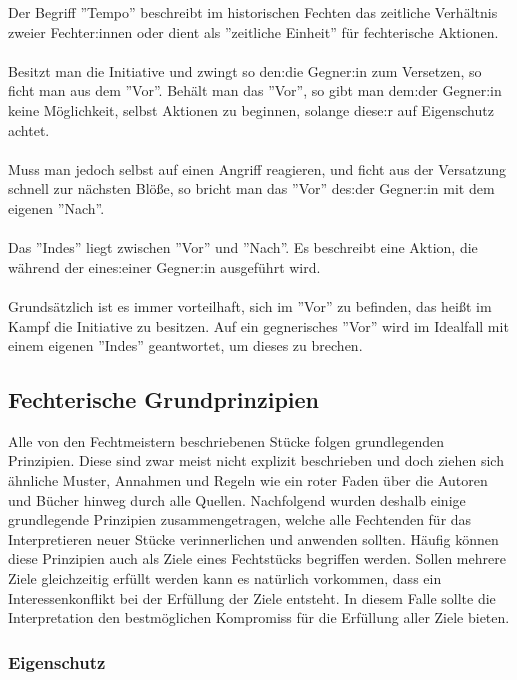 Der Begriff ''Tempo'' beschreibt im historischen Fechten das zeitliche Verhältnis zweier Fechter:innen oder dient als ''zeitliche Einheit'' für fechterische Aktionen.
\\
\\
Besitzt man die Initiative und zwingt so den:die Gegner:in zum Versetzen, so ficht man aus dem ''Vor''.
Behält man das ''Vor'', so gibt man dem:der Gegner:in keine Möglichkeit, selbst Aktionen zu beginnen, solange diese:r auf Eigenschutz achtet.
\\
\\
Muss man jedoch selbst auf einen Angriff reagieren, und ficht aus der Versatzung schnell zur nächsten Blöße, so bricht man das ''Vor'' des:der Gegner:in mit dem eigenen ''Nach''.
\\
\\
Das ''Indes'' liegt zwischen ''Vor'' und ''Nach''.
Es beschreibt eine Aktion, die während der eines:einer Gegner:in ausgeführt wird.
\\
\\
Grundsätzlich ist es immer vorteilhaft, sich im ''Vor'' zu befinden, das heißt im Kampf die Initiative zu besitzen.
Auf ein gegnerisches ''Vor'' wird im Idealfall mit einem eigenen ''Indes'' geantwortet, um dieses zu brechen.

\subsection{Fechterische Grundprinzipien}

Alle von den Fechtmeistern beschriebenen Stücke folgen grundlegenden Prinzipien.
Diese sind zwar meist nicht explizit beschrieben und doch ziehen sich ähnliche Muster, Annahmen und Regeln wie ein roter Faden über die Autoren und Bücher hinweg durch alle Quellen.
Nachfolgend wurden deshalb einige grundlegende Prinzipien zusammengetragen, welche alle Fechtenden für das Interpretieren neuer Stücke verinnerlichen und anwenden sollten.
Häufig können diese Prinzipien auch als Ziele eines Fechtstücks begriffen werden.
Sollen mehrere Ziele gleichzeitig erfüllt werden kann es natürlich vorkommen, dass ein Interessenkonflikt bei der Erfüllung der Ziele entsteht.
In diesem Falle sollte die Interpretation den bestmöglichen Kompromiss für die Erfüllung aller Ziele bieten.

\subsubsection{Eigenschutz}

